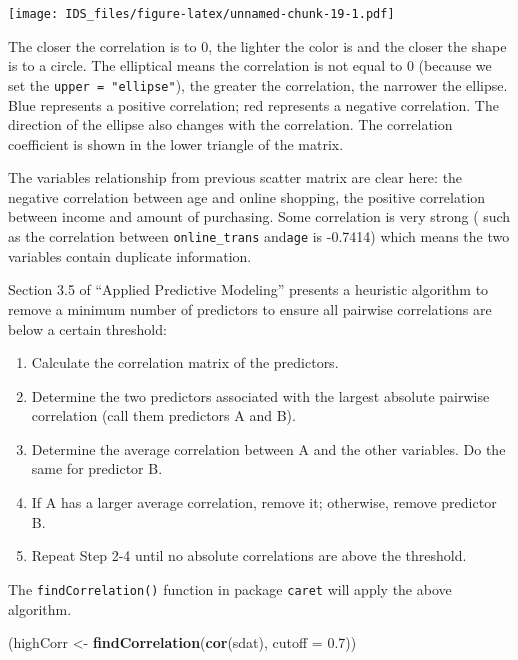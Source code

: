 \documentclass[12pt,]{krantz}
\makeatletter
\newenvironment{Shaded}{\begin{snugshade}}{\end{snugshade}}
\newcommand{\DataTypeTok}[1]{\textcolor[rgb]{0.27,0.27,0.27}{#1}}
\newcommand{\FloatTok}[1]{\textcolor[rgb]{0.06,0.06,0.06}{#1}}
\newcommand{\KeywordTok}[1]{\textcolor[rgb]{0.27,0.27,0.27}{\textbf{#1}}}
\newcommand{\NormalTok}[1]{#1}
\newcommand{\StringTok}[1]{\textcolor[rgb]{0.5,0.5,0.5}{#1}}
\providecommand{\tightlist}{%
  \setlength{\itemsep}{0pt}\setlength{\parskip}{0pt}}
\renewenvironment{quote}{\begin{VF}}{\end{VF}}
\newenvironment{kframe}{%
\medskip{}
\setlength{\fboxsep}{.8em}
 \def\at@end@of@kframe{}%
 \ifinner\ifhmode%
  \def\at@end@of@kframe{\end{minipage}}%
  \begin{minipage}{\columnwidth}%
 \fi\fi%
 \def\FrameCommand##1{\hskip\@totalleftmargin \hskip-\fboxsep
 \colorbox{shadecolor}{##1}\hskip-\fboxsep
     \hskip-\linewidth \hskip-\@totalleftmargin \hskip\columnwidth}%
 \MakeFramed {\advance\hsize-\width
   \@totalleftmargin\z@ \linewidth\hsize
   \@setminipage}}%
 {\par\unskip\endMakeFramed%
 \at@end@of@kframe}
\renewenvironment{Shaded}{\begin{kframe}}{\end{kframe}}
\makeatother
\begin{document}
\texttt{[image: IDS\_files/figure-latex/unnamed-chunk-19-1.pdf]}

The closer the correlation is to 0, the lighter the color is and the closer the shape is to a circle. The elliptical means the correlation is not equal to 0 (because we set the \texttt{upper\ =\ "ellipse"}), the greater the correlation, the narrower the ellipse. Blue represents a positive correlation; red represents a negative correlation. The direction of the ellipse also changes with the correlation. The correlation coefficient is shown in the lower triangle of the matrix.

The variables relationship from previous scatter matrix are clear here: the negative correlation between age and online shopping, the positive correlation between income and amount of purchasing. Some correlation is very strong ( such as the correlation between \texttt{online\_trans} and\texttt{age} is -0.7414) which means the two variables contain duplicate information.

Section 3.5 of ``Applied Predictive Modeling'' \citep{APM} presents a heuristic algorithm to remove a minimum number of predictors to ensure all pairwise correlations are below a certain threshold:

\begin{quote}
\begin{enumerate}
\def\labelenumi{(\arabic{enumi})}
\tightlist
\item
  Calculate the correlation matrix of the predictors.
\item
  Determine the two predictors associated with the largest absolute pairwise correlation (call them predictors A and B).
\item
  Determine the average correlation between A and the other variables. Do the same for predictor B.
\item
  If A has a larger average correlation, remove it; otherwise, remove predictor B.
\item
  Repeat Step 2-4 until no absolute correlations are above the threshold.
\end{enumerate}
\end{quote}

The \texttt{findCorrelation()} function in package \texttt{caret} will apply the above algorithm.

\begin{Shaded}
\begin{Highlighting}[]
\NormalTok{(highCorr <-}\StringTok{ }\KeywordTok{findCorrelation}\NormalTok{(}\KeywordTok{cor}\NormalTok{(sdat), }\DataTypeTok{cutoff =} \FloatTok{0.7}\NormalTok{))}
\end{Highlighting}
\end{Shaded}
\end{document}
